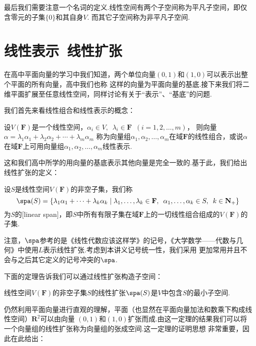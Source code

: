 最后我们需要注意一个名词的定义.线性空间有两个子空间称为平凡子空间，即仅含零元的子集$\{0\}$和其自身$V$.
而其它子空间称为非平凡子空间.

\section{线性表示\ 线性扩张}
在高中平面向量的学习中我们知道，两个单位向量$(0,1)$和$(1,0)$可以表示出整个平面的所有向量，高中我们也称
这样的向量为平面向量的基底.接下来我们将二维平面扩展至任意线性空间，同样讨论有关于``表示''、``基底''的问题.

我们首先来看线性组合和线性表示的概念：
\begin{definition}
    设$V(\mathbf{F})$是一个线性空间，$\alpha_i\in V,\enspace\lambda_i\in \mathbf{F}\enspace(i=1,2,\ldots,m)$，
    则向量$\alpha=\lambda_1\alpha_1+\lambda_2\alpha_2+\cdots+\lambda_m\alpha_m$
    称为向量组$\alpha_1,\alpha_2,\ldots,\alpha_m$在域$\mathbf{F}$的线性组合，或说$\alpha$
    在域$\mathbf{F}$上可用向量组$\alpha_1,\alpha_2,\ldots,\alpha_m$线性表示.
\end{definition}
这和我们高中所学的用向量的基底表示其他向量是完全一致的.基于此，我们给出线性扩张的定义：
\begin{definition}
    设$S$是线性空间$V(\mathbf{F})$的非空子集，我们称
    \[ \spa(S)=\{\lambda_1\alpha_1+\cdots+\lambda_k\alpha_k \mid \lambda_1,\ldots,\lambda_k\in\mathbf{F},\enspace\alpha_1,\ldots,\alpha_k\in S,\enspace k\in\mathbf{N_+}\} \]
    为$S$的[linear span]，即$S$中所有有限子集在域$\mathbf{F}$上的一切线性组合组成的$V(\mathbf{F})$的子集.
\end{definition}
注意，$\spa$参考的是《线性代数应该这样学》的记号，《大学数学——代数与几何》中使用$L$表示线性扩张.考虑到本讲义记号统一性，我们采用
更加常用并且不会与之后其它定义的记号冲突的$\spa$.

下面的定理告诉我们可以通过线性扩张构造子空间：
\begin{theorem}
    线性空间$V(\mathbf{F})$的非空子集$S$的线性扩张$\spa(S)$是$V$中包含$S$的最小子空间.
\end{theorem}
仍然利用平面向量进行直观的理解，平面（也显然在平面向量加法和数乘下构成线性空间）$\mathbf{R}^2$可以由向量
$(0,1)$和$(1,0)$扩张而成.由这一定理的结果我们可以将一个向量组的线性扩张称为向量组的张成空间.这一定理的证明思想
非常重要，因此在此给出：

